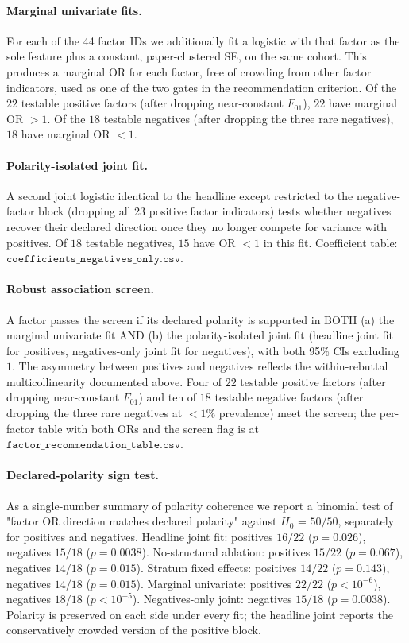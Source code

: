 \documentclass{article}
\newcommand{\code}[1]{\texttt{#1}}
\begin{document}
\paragraph{Marginal univariate fits.} For each of the 44 factor IDs we additionally fit a logistic with that factor as the sole feature plus a constant, paper-clustered SE, on the same cohort. This produces a marginal OR for each factor, free of crowding from other factor indicators, used as one of the two gates in the recommendation criterion. Of the $22$ testable positive factors (after dropping near-constant $F_{01}$), $22$ have marginal OR $> 1$. Of the $18$ testable negatives (after dropping the three rare negatives), $18$ have marginal OR $< 1$.

\paragraph{Polarity-isolated joint fit.} A second joint logistic identical to the headline except restricted to the negative-factor block (dropping all 23 positive factor indicators) tests whether negatives recover their declared direction once they no longer compete for variance with positives. Of $18$ testable negatives, $15$ have OR $< 1$ in this fit. Coefficient table: $\code{coefficients\_negatives\_only.csv}$.

\paragraph{Robust association screen.} A factor passes the screen if its declared polarity is supported in BOTH (a) the marginal univariate fit AND (b) the polarity-isolated joint fit (headline joint fit for positives, negatives-only joint fit for negatives), with both 95\% CIs excluding $1$. The asymmetry between positives and negatives reflects the within-rebuttal multicollinearity documented above. Four of $22$ testable positive factors (after dropping near-constant $F_{01}$) and ten of $18$ testable negative factors (after dropping the three rare negatives at $<1\%$ prevalence) meet the screen; the per-factor table with both ORs and the screen flag is at $\code{factor\_recommendation\_table.csv}$.

\paragraph{Declared-polarity sign test.} As a single-number summary of polarity coherence we report a binomial test of "factor OR direction matches declared polarity" against $H_0$ = $50/50$, separately for positives and negatives. Headline joint fit: positives $16/22$ ($p = 0.026$), negatives $15/18$ ($p = 0.0038$). No-structural ablation: positives $15/22$ ($p = 0.067$), negatives $14/18$ ($p = 0.015$). Stratum fixed effects: positives $14/22$ ($p = 0.143$), negatives $14/18$ ($p = 0.015$). Marginal univariate: positives $22/22$ ($p < 10^{-6}$), negatives $18/18$ ($p < 10^{-5}$). Negatives-only joint: negatives $15/18$ ($p = 0.0038$). Polarity is preserved on each side under every fit; the headline joint reports the conservatively crowded version of the positive block.
\end{document}
